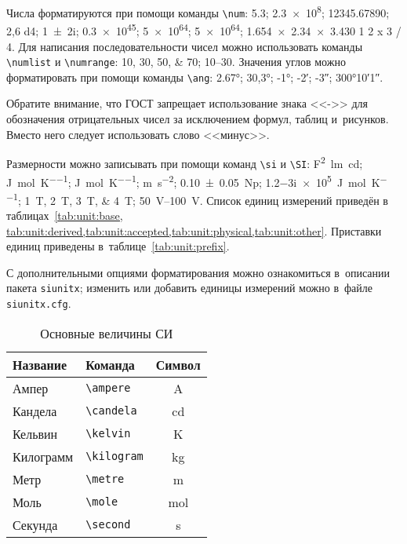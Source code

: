 Числа форматируются при помощи команды \verb|\num|:
\num{5,3};
\num{2,3e8};
\num{12345,67890};
\num{2,6 d4};
\num{1+-2i};
\num{.3e45};
\num[exponent-base=2]{5 e64};
\num[exponent-base=2,exponent-to-prefix]{5 e64};
\num{1.654 x 2.34 x 3.430}
\num{1 2 x 3 / 4}.
Для написания последовательности чисел можно использовать команды \verb|\numlist| и \verb|\numrange|:
\numlist{10;30;50;70}; \numrange{10}{30}.
Значения углов можно форматировать при помощи команды \verb|\ang|:
\ang{2.67};
\ang{30,3};
\ang{-1;;};
\ang{;-2;};
\ang{;;-3};
\ang{300;10;1}.

Обратите внимание, что ГОСТ запрещает использование знака <<->> для обозначения отрицательных чисел
за исключением формул, таблиц и~рисунков.
Вместо него следует использовать слово <<минус>>.

Размерности можно записывать при помощи команд \verb|\si| и \verb|\SI|:
\si{\farad\squared\lumen\candela};
\si{\joule\per\mole\per\kelvin};
\si[per-mode = symbol-or-fraction]{\joule\per\mole\per\kelvin};
\si{\metre\per\second\squared};
\SI{0.10(5)}{\neper};
\SI{1.2-3i e5}{\joule\per\mole\per\kelvin};
\SIlist{1;2;3;4}{\tesla};
\SIrange{50}{100}{\volt}.
Список единиц измерений приведён в таблицах~\cref{tab:unit:base,
tab:unit:derived,tab:unit:accepted,tab:unit:physical,tab:unit:other}.
Приставки единиц приведены в~таблице~\cref{tab:unit:prefix}.

С дополнительными опциями форматирования можно ознакомиться в~описании пакета \texttt{siunitx};
изменить или добавить единицы измерений можно в~файле \texttt{siunitx.cfg}.

\begin{table}
    \centering
    \captionsetup{justification=centering} %
    \caption{Основные величины СИ}\label{tab:unit:base}
    \begin{tabular}{llc}
        \toprule
        Название  & Команда                & Символ         \\
        \midrule
        Ампер     & \verb|\ampere| & \si{\ampere}   \\
        Кандела   & \verb|\candela| & \si{\candela}  \\
        Кельвин   & \verb|\kelvin| & \si{\kelvin}   \\
        Килограмм & \verb|\kilogram| & \si{\kilogram} \\
        Метр      & \verb|\metre| & \si{\metre}    \\
        Моль      & \verb|\mole| & \si{\mole}     \\
        Секунда   & \verb|\second| & \si{\second}   \\
        \bottomrule
    \end{tabular}
\end{table}

